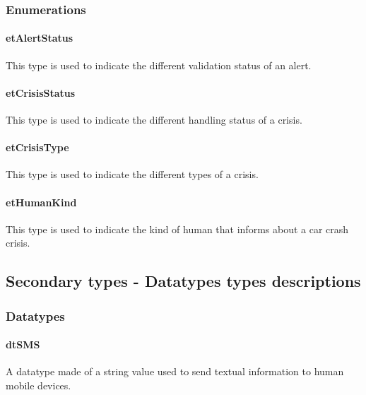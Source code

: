 \subsubsection{Enumerations}

\paragraph*{\textbf{etAlertStatus}} 
This type is used to indicate the different validation status of
an alert.

\paragraph*{\textbf{etCrisisStatus}} 
This type is used to indicate the different handling status of a
crisis.

\paragraph*{\textbf{etCrisisType}} 
This type is used to indicate the different types of a crisis.

\paragraph*{\textbf{etHumanKind}} 
This type is used to indicate the kind of human that informs about a
car crash crisis.

\subsection{Secondary types - Datatypes types descriptions}

\subsubsection{Datatypes}

\paragraph*{\textbf{dtSMS}}
A datatype made of a string value used to send textual information to human
mobile devices.



